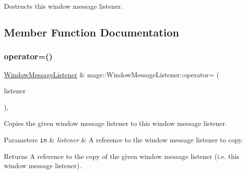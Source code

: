 Destructs this window message listener. 

\subsection{Member Function Documentation}
\mbox{\label{classmage_1_1_window_message_listener_a6c4b5ae43b7c1e14d16c3ba639746804}} 
\subsubsection{\texorpdfstring{operator=()}{operator=()}\hspace{0.1cm}{\footnotesize\ttfamily [1/2]}}
{\footnotesize\ttfamily \mbox{\hyperlink{classmage_1_1_window_message_listener}{Window\+Message\+Listener}} \& mage\+::\+Window\+Message\+Listener\+::operator= (\begin{DoxyParamCaption}\item[{const \mbox{\hyperlink{classmage_1_1_window_message_listener}{Window\+Message\+Listener}} \&}]{listener }\end{DoxyParamCaption})\hspace{0.3cm}{\ttfamily [default]}, {\ttfamily [noexcept]}}

Copies the given window message listener to this window message listener.


\begin{DoxyParams}[1]{Parameters}
\mbox{\tt in}  & {\em listener} & A reference to the window message listener to copy. \\
\hline
\end{DoxyParams}
\begin{DoxyReturn}{Returns}
A reference to the copy of the given window message listener (i.\+e. this window message listener). 
\end{DoxyReturn}
\mbox{\label{classmage_1_1_window_message_listener_a74dee5de5b949db3eb755936ee15ecb9}} 

